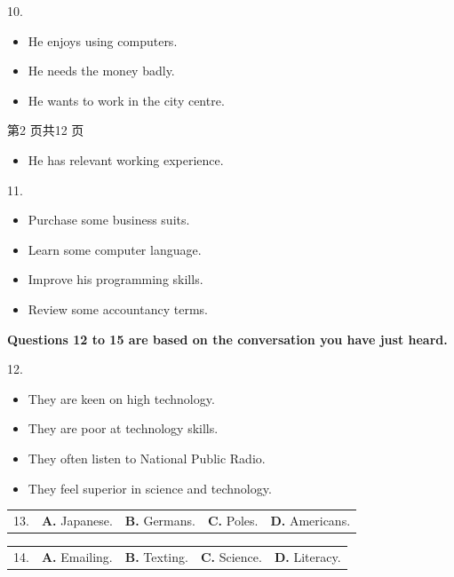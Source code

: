 \documentclass[UTF8,11pt]{ctexart}
\begin{document}
10.


\begin{itemize}[leftmargin=2em,itemsep=.2em,topsep=.4em]\item[A.] He enjoys using computers.
\item[B.] He needs the money badly.
\item[C.] He wants to work in the city centre.
\end{itemize}

第2 页共12 页


\begin{itemize}[leftmargin=2em,itemsep=.2em,topsep=.4em]\item[D.] He has relevant working experience.
\end{itemize}

11.


\begin{itemize}[leftmargin=2em,itemsep=.2em,topsep=.4em]\item[A.] Purchase some business suits.
\item[B.] Learn some computer language.
\item[C.] Improve his programming skills.
\item[D.] Review some accountancy terms.
\end{itemize}

\textbf{Questions 12 to 15 are based on the conversation you have just heard.}


12.


\begin{itemize}[leftmargin=2em,itemsep=.2em,topsep=.4em]\item[A.] They are keen on high technology.
\item[B.] They are poor at technology skills.
\item[C.] They often listen to National Public Radio.
\item[D.] They feel superior in science and technology.
\end{itemize}

\noindent\begin{tabularx}{\linewidth}{@{}lXXXX@{}}13. & \textbf{A.} Japanese. & \textbf{B.} Germans. & \textbf{C.} Poles. & \textbf{D.} Americans.\\\end{tabularx}\par

\noindent\begin{tabularx}{\linewidth}{@{}lXXXX@{}}14. & \textbf{A.} Emailing. & \textbf{B.} Texting. & \textbf{C.} Science. & \textbf{D.} Literacy.\\\end{tabularx}\par
\end{document}
